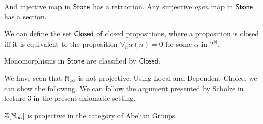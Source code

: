 \begin{proposition}
  And injective map in $\mathsf{Stone}$ has a retraction. Any surjective {\em open} map in $\mathsf{Stone}$ has a section.
\end{proposition}

\medskip

We can define the set $\mathsf{Closed}$ of closed propositions, where a proposition is closed iff it is equivalent to
the proposition $\forall_n \alpha(n) = 0$ for some $\alpha$ in $2^{\mathbb{N}}$.

\begin{theorem}
  Monomorphisms in $\mathsf{Stone}$ are classified by $\mathsf{Closed}$.
\end{theorem}

\medskip

We have seen that $\mathbb{N}_{\infty}$ is not projective. Using Local and Dependent Choice, we can show the following.
We can follow the argument presented by Scholze in lecture 3 in the present axiomatic setting.

\begin{theorem}
  $\mathbb{Z}[\mathbb{N}_{\infty}]$ is projective in the category of Abelian Groups.
\end{theorem}

